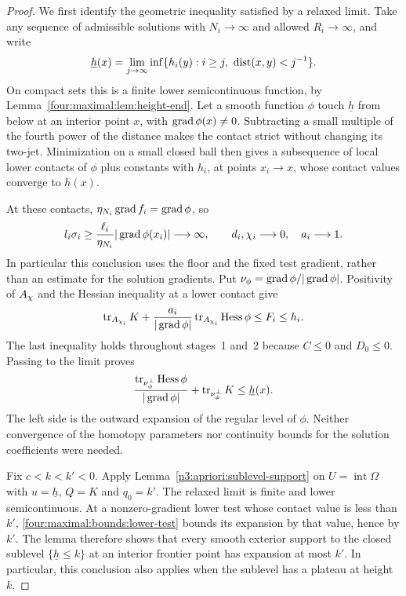 \begin{proof}
We first identify the geometric inequality satisfied by a relaxed
limit. Take any sequence of admissible solutions with $N_i\to\infty$
and allowed $R_i\to\infty$, and write
\[
 \underline h(x)=\lim_{j\to\infty}
 \inf\{h_i(y):i\ge j,\ \operatorname{dist}(x,y)<j^{-1}\}.
\]
On compact sets this is a finite lower semicontinuous function, by
Lemma~\ref{four:maximal:lem:height-end}. Let a smooth function $\phi$ touch
$\underline h$ from below at an interior point $x$, with
$\operatorname{grad}\phi(x)\ne0$. Subtracting a small multiple of the fourth power
of the distance makes the contact strict without changing its two-jet.
Minimization on a small closed ball then gives a subsequence of local
lower contacts of $\phi$ plus constants with $h_i$, at points $x_i\to x$,
whose contact values converge to $\underline h(x)$.

At these contacts, $\eta_{N_i}\operatorname{grad} f_i=\operatorname{grad}\phi$, so
\[
 l_i\sigma_i\ge\frac{\ell_i}{\eta_{N_i}}|\operatorname{grad}\phi(x_i)|\longrightarrow\infty,
 \qquad d_i,\chi_i\longrightarrow0,\quad a_i\longrightarrow1.
\]
In particular this conclusion uses the floor and the fixed test
gradient, rather than an estimate for the solution gradients.
Put $\nu_\phi=\operatorname{grad}\phi/|\operatorname{grad}\phi|$. Positivity of $A_\chi$ and the
Hessian inequality at a lower contact give
\[
 \operatorname{tr}_{A_{\chi_i}}K+
 \frac{a_i}{|\operatorname{grad}\phi|}
       \operatorname{tr}_{A_{\chi_i}}\operatorname{Hess}\phi
 \le F_i\le h_i.
\]
The last inequality holds throughout stages~1 and~2 because
$C\le0$ and $D_0\le0$. Passing to the limit proves
\begin{equation}\label{four:maximal:bounds:lower-test}
 \frac{\operatorname{tr}_{\nu_\phi^\perp}\operatorname{Hess}\phi}{|\operatorname{grad}\phi|}
       +\operatorname{tr}_{\nu_\phi^\perp}K\le\underline h(x).
\end{equation}
The left side is the outward expansion of the regular level of $\phi$.
Neither convergence of the homotopy parameters nor continuity bounds
for the solution coefficients were needed.

Fix $c<k<k'<0$.  Apply Lemma~\ref{n3:apriori:sublevel-support}
on $U=\operatorname{int}\Omega$ with $u=\underline h$, $Q=K$ and
$q_0=k'$.  The relaxed limit is finite and lower semicontinuous.
At a nonzero-gradient lower test whose contact value is less than $k'$,
\eqref{four:maximal:bounds:lower-test} bounds its expansion by that
value, hence by $k'$.  The lemma therefore shows that every smooth
exterior support to the closed sublevel $\{\underline h\le k\}$
at an interior frontier point has expansion at most $k'$.  In particular,
this conclusion also applies when the sublevel has a plateau at height $k$.


\end{proof}
